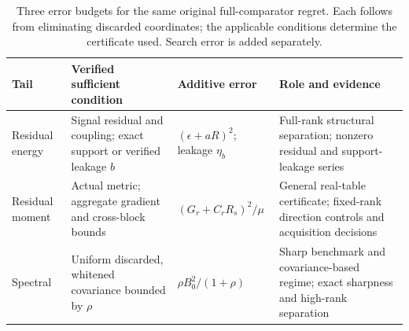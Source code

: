 \begin{table}[t]
\caption{Three error budgets for the same original full-comparator regret. Each follows from eliminating discarded coordinates; the applicable conditions determine the certificate used. Search error is added separately.}
\label{tab:tails}
\centering\small\setlength{\tabcolsep}{4pt}
\begin{tabular}{p{}p{}p{}p{}}
\toprule
Tail & Verified sufficient condition & Additive error & Role and evidence \\
\midrule
Residual energy & Signal residual and coupling; exact support or verified leakage $b$ & $(\epsilon+aR)^2$; leakage $\eta_b$ & Full-rank structural separation; nonzero residual and support-leakage series \\
Residual moment & Actual metric; aggregate gradient and cross-block bounds & $(G_r+C_rR_s)^2/\mu$ & General real-table certificate; fixed-rank direction controls and acquisition decisions \\
Spectral & Uniform discarded, whitened covariance bounded by $\rho$ & $\rho B_0^2/(1+\rho)$ & Sharp benchmark and covariance-based regime; exact sharpness and high-rank separation \\
\bottomrule
\end{tabular}
\end{table}
